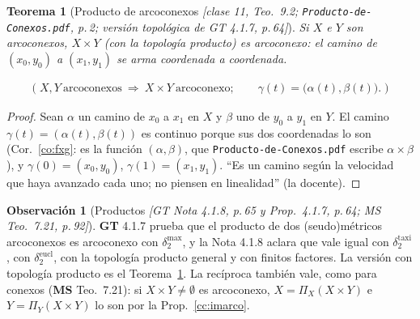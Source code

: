 \documentclass[11pt,a4paper]{article}
\newcommand{\lgc}[1]{\par\vspace{-3pt}\begin{gather*}\big(\;#1\;\big)\end{gather*}\vspace{-6pt}}
\theoremstyle{definition}
\newtheorem{observacion}[definicion]{Observación}
\theoremstyle{plain}
\newtheorem{teorema}[definicion]{Teorema}
\newcommand{\fnt}[1]{{\normalfont\small\itshape\color{gray!150!black}[#1]}}
\begin{document}
\begin{teorema}[Producto de arcoconexos \fnt{clase 11, Teo.\ 9.2; \texttt{Producto-de-Conexos.pdf}, p.\,2; versión topológica de GT 4.1.7, p.\,64}]\label{cc:prodarco}
Si $X$ e $Y$ son arcoconexos, $X\times Y$ (con la topología producto) es arcoconexo: el camino de $(x_0,y_0)$ a $(x_1,y_1)$ se arma coordenada a coordenada.
\lgc{X,Y\ \text{arcoconexos}\ \Rightarrow\ X\times Y\ \text{arcoconexo};\qquad \gamma(t)=\big(\alpha(t),\beta(t)\big).}
\end{teorema}

\begin{proof}
Sean $\alpha$ un camino de $x_0$ a $x_1$ en $X$ y $\beta$ uno de $y_0$ a $y_1$ en $Y$. El camino $\gamma(t)=(\alpha(t),\beta(t))$ es continuo porque sus dos coordenadas lo son (Cor.~\ref{co:fxg}: es la función $(\alpha,\beta)$, que \texttt{Producto-de-Conexos.pdf} escribe $\alpha\times\beta$), y $\gamma(0)=(x_0,y_0)$, $\gamma(1)=(x_1,y_1)$. ``Es un camino según la velocidad que haya avanzado cada uno; no piensen en linealidad'' (la docente).
\end{proof}

\begin{observacion}[Productos \fnt{GT Nota 4.1.8, p.\,65 y Prop.\ 4.1.7, p.\,64; MS Teo.\ 7.21, p.\,92}]
\textbf{GT} 4.1.7 prueba que el producto de dos (seudo)métricos arcoconexos es arcoconexo con $\delta^{\max}_2$, y la Nota 4.1.8 aclara que vale igual con $\delta_2^{\mathrm{taxi}}$, con $\delta_2^{\mathrm{eucl}}$, con la topología producto general y con finitos factores. La versión con topología producto es el Teorema~\ref{cc:prodarco}. La recíproca también vale, como para conexos (\textbf{MS} Teo.\ 7.21): si $X\times Y\ne\emptyset$ es arcoconexo, $X=\Pi_X(X\times Y)$ e $Y=\Pi_Y(X\times Y)$ lo son por la Prop.~\ref{cc:imarco}.
\end{observacion}
\end{document}

